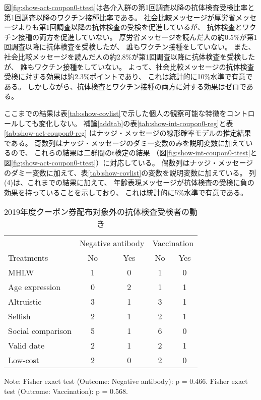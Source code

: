 \documentclass[
  11pt,
  a4paper,
]{article}
\begin{document}
図\ref{fig:show-act-coupon0-ttest}は各介入群の第1回調査以降の抗体検査受検比率と
第1回調査以降のワクチン接種比率である。
社会比較メッセージが厚労省メッセージよりも第1回調査以降の抗体検査の受検を促進しているが、
抗体検査とワクチン接種の両方を促進していない。
厚労省メッセージを読んだ人の約0.5\%が第1回調査以降に抗体検査を受検したが、
誰もワクチン接種をしていない。
また、社会比較メッセージを読んだ人の約2.8\%が第1回調査以降に抗体検査を受検したが、
誰もワクチン接種をしていない。
よって、社会比較メッセージの抗体検査受検に対する効果は約2.3\%ポイントであり、
これは統計的に10\%水準で有意である。
しかしながら、抗体検査とワクチン接種の両方に対する効果はゼロである。

ここまでの結果は表\ref{tab:show-covlist}で示した個人の観察可能な特徴をコントロールしても変化しない。
補論\ref{addtab}の表\ref{tab:show-int-coupon0-reg}と表\ref{tab:show-act-coupon0-reg}
はナッジ・メッセージの線形確率モデルの推定結果である。
奇数列はナッジ・メッセージのダミー変数のみを説明変数に加えているので、
これらの結果は二群間のt検定の結果
（図\ref{fig:show-int-coupon0-ttest}と図\ref{fig:show-act-coupon0-ttest}）に対応している。
偶数列はナッジ・メッセージのダミー変数に加えて、表\ref{tab:show-covlist}の変数を説明変数に加えている。
列(4)は、これまでの結果に加えて、
年齢表現メッセージが抗体検査の受検に負の効果を持っていることを示しており、
これは統計的に5\%水準で有意である。

\begin{table}

\caption{\label{tab:show-tester-coupon0}2019年度クーポン券配布対象外の抗体検査受検者の動き}
\centering
\begin{threeparttable}
\begin{tabular}[t]{lcccc}
\toprule
\multicolumn{1}{c}{ } & \multicolumn{2}{c}{Negative antibody} & \multicolumn{2}{c}{Vaccination} \\
\cmidrule(l{3pt}r{3pt}){2-3} \cmidrule(l{3pt}r{3pt}){4-5}
Treatments & No & Yes & No  & Yes \\
\midrule
MHLW & 1 & 0 & 1 & 0\\
Age expression & 0 & 2 & 1 & 1\\
Altruistic & 3 & 1 & 3 & 1\\
Selfish & 2 & 1 & 2 & 1\\
Social comparison & 5 & 1 & 6 & 0\\
Valid date & 2 & 1 & 2 & 1\\
Low-cost & 2 & 0 & 2 & 0\\
\bottomrule
\end{tabular}
\begin{tablenotes}
\item Note: Fisher exact test (Outcome: Negative antibody): p = 0.466. Fisher exact test (Outcome: Vaccination): p = 0.568.
\end{tablenotes}
\end{threeparttable}
\end{table}
\end{document}
